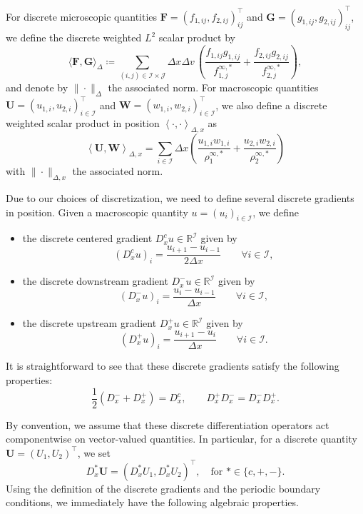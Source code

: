 \documentclass[reqno]{amsart}
\newcommand{\Dx}{\Delta x}
\newcommand{\Dv}{\Delta v}
\newcommand{\R}{\mathbb{R}}
\newcommand{\II}{\mathcal{I}}
\newcommand{\J}{\mathcal{J}}
\newcommand{\Fbf}{\mathbf{F}}
\newcommand{\Gbf}{\mathbf{G}}
\newcommand{\lla}{\left\langle}
\newcommand{\rra}{\right\rangle}
\numberwithin{equation}{section}
\begin{document}
For discrete microscopic quantities $\Fbf=\left(f_{1,ij},f_{2,ij}\right)^\top_{ij}$ and $ \Gbf=\left( g_{1,ij}, g_{2,ij} \right)^\top_{ij}$, we define the discrete weighted $L^2$ scalar product by
\begin{equation}\label{def_psL2weighted_sdis}
    \langle \Fbf,\Gbf\rangle_\Delta\coloneq\sum_{(i,j)\in\II\times\J}\Dx\Dv\,\left(\frac{f_{1,ij}g_{1,ij}}{f_{1,j}^{\infty,*}} + \frac{f_{2,ij}g_{2,ij}}{f_{2,j}^{\infty,*}}\right),
\end{equation}
and denote by $\|\cdot\|_\Delta$ the associated norm. For macroscopic quantities $\mathbf{U}=\left(u_{1,i}, u_{2,i} \right)^\top_{i\in\II}$ and $\mathbf{W}=\left( w_{1,i}, w_{2,i} \right)^\top_{i\in\II}$, we also define a discrete weighted scalar product in position $\lla \cdot,\cdot\rra_{\Delta,x}$ as
\begin{equation}\label{def_psL2weightedposition_sdis}
    \lla \mathbf{U}, \mathbf{W}\rra_{\Delta,x} = \sum_{i\in\II}\Dx\left(\frac{u_{1,i}w_{1,i}}{\rho_1^{\infty,*}} + \frac{u_{2,i}w_{2,i}}{\rho_2^{\infty,*}}\right)
\end{equation}
with $\|\cdot\|_{\Delta,x}$ the associated norm. 

Due to our choices of discretization, we need to define several discrete gradients in position. Given a macroscopic quantity $u=(u_i)_{i\in\II}$, we define 
\begin{itemize}
\item the discrete centered gradient $D_x^c u\in\R^\II$ given by
\[(D_x^cu)_i=\frac{u_{i+1}-u_{i-1}}{2\Dx} \qquad \forall i\in\II,\]
\item the discrete downstream gradient $D_x^-u\in\R^\II$ given by
\[(D_x^-u)_i=\frac{u_{i}-u_{i-1}}{\Dx} \qquad \forall i\in\II,\]
\item the discrete upstream gradient $D_x^+u\in\R^\II$ given by
\[(D_x^+u)_i=\frac{u_{i+1}-u_{i}}{\Dx} \qquad \forall i\in\II.\]
\end{itemize}
It is straightforward to see that these discrete gradients satisfy the following properties:
\begin{equation}\label{prop_gradients_dis}
    \frac{1}{2}(D_x^-+D_x^+)=D_x^c, \qquad D_x^+D_x^-=D_x^-D_x^+.
\end{equation}

By convention, we assume that these discrete differentiation operators act componentwise on vector-valued quantities. In particular, for a discrete quantity $\mathbf{U}=(U_1,U_2)^\top$, we set
\[D_x^*\mathbf{U}=(D_x^*U_1,D_x^*U_2)^\top, \quad \text{for }*\in\{c,+,-\}.\]
Using the definition of the discrete gradients and the periodic boundary conditions, we immediately have the following algebraic properties.
\end{document}
